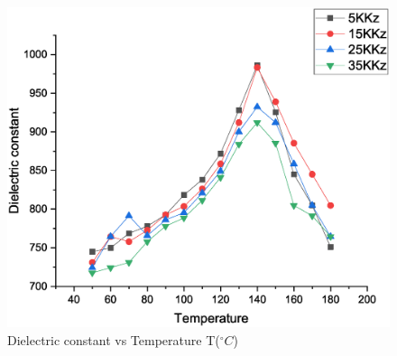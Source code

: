 		
		
		
		
		\begin{figure}[H]
			\centering
			\label{graph:5}
			\includegraphics[width=0.8\columnwidth]{images/g5.eps}
			\caption{Dielectric constant vs Temperature T($^\circ C$)}
		\end{figure}
